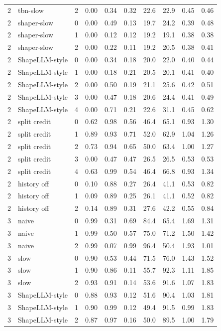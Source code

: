 \begin{table}[ht]
\begin{tabular}{cllrrrrrrr}
2 & tbn-slow & 2 & 0.00 & 0.34 & 0.32 & 22.6 & 22.9 & 0.45 & 0.46 \\
2 & shaper-slow & 0 & 0.00 & 0.49 & 0.13 & 19.7 & 24.2 & 0.39 & 0.48 \\
2 & shaper-slow & 1 & 0.00 & 0.12 & 0.12 & 19.2 & 19.1 & 0.38 & 0.38 \\
2 & shaper-slow & 2 & 0.00 & 0.22 & 0.11 & 19.2 & 20.5 & 0.38 & 0.41 \\
2 & ShapeLLM-style & 0 & 0.00 & 0.34 & 0.18 & 20.0 & 22.0 & 0.40 & 0.44 \\
2 & ShapeLLM-style & 1 & 0.00 & 0.18 & 0.21 & 20.5 & 20.1 & 0.41 & 0.40 \\
2 & ShapeLLM-style & 2 & 0.00 & 0.50 & 0.19 & 21.1 & 25.6 & 0.42 & 0.51 \\
2 & ShapeLLM-style & 3 & 0.00 & 0.47 & 0.18 & 20.6 & 24.4 & 0.41 & 0.49 \\
2 & ShapeLLM-style & 4 & 0.00 & 0.71 & 0.21 & 22.6 & 31.1 & 0.45 & 0.62 \\
2 & split credit & 0 & 0.62 & 0.98 & 0.56 & 46.4 & 65.1 & 0.93 & 1.30 \\
2 & split credit & 1 & 0.89 & 0.93 & 0.71 & 52.0 & 62.9 & 1.04 & 1.26 \\
2 & split credit & 2 & 0.73 & 0.94 & 0.65 & 50.0 & 63.4 & 1.00 & 1.27 \\
2 & split credit & 3 & 0.00 & 0.47 & 0.47 & 26.5 & 26.5 & 0.53 & 0.53 \\
2 & split credit & 4 & 0.63 & 0.99 & 0.54 & 46.4 & 66.8 & 0.93 & 1.34 \\
2 & history off & 0 & 0.10 & 0.88 & 0.27 & 26.4 & 41.1 & 0.53 & 0.82 \\
2 & history off & 1 & 0.09 & 0.89 & 0.25 & 26.1 & 41.1 & 0.52 & 0.82 \\
2 & history off & 2 & 0.14 & 0.89 & 0.31 & 27.6 & 42.2 & 0.55 & 0.84 \\
3 & naive & 0 & 0.99 & 0.31 & 0.69 & 84.4 & 65.4 & 1.69 & 1.31 \\
3 & naive & 1 & 0.99 & 0.50 & 0.57 & 75.0 & 71.2 & 1.50 & 1.42 \\
3 & naive & 2 & 0.99 & 0.07 & 0.99 & 96.4 & 50.4 & 1.93 & 1.01 \\
3 & slow & 0 & 0.90 & 0.53 & 0.44 & 71.5 & 76.0 & 1.43 & 1.52 \\
3 & slow & 1 & 0.90 & 0.86 & 0.11 & 55.7 & 92.3 & 1.11 & 1.85 \\
3 & slow & 2 & 0.93 & 0.91 & 0.14 & 53.6 & 91.6 & 1.07 & 1.83 \\
3 & ShapeLLM-style & 0 & 0.88 & 0.93 & 0.12 & 51.6 & 90.4 & 1.03 & 1.81 \\
3 & ShapeLLM-style & 1 & 0.90 & 0.99 & 0.12 & 49.4 & 91.5 & 0.99 & 1.83 \\
3 & ShapeLLM-style & 2 & 0.87 & 0.97 & 0.16 & 50.0 & 89.5 & 1.00 & 1.79 \\
\bottomrule
\end{tabular}
\end{table}
